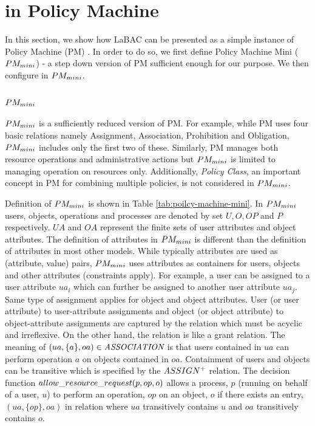 \section{\hlabac{} in Policy Machine}
\label{sec:pm}


In this section, we show how LaBAC can be presented as a simple instance of Policy Machine (PM) \cite{policy-machine}. In order to do so, we first define Policy Machine Mini ($PM_{mini}{}$) - a step down version of PM sufficient enough for our purpose. We then configure \hlabac{} in $PM_{mini}{}$.

\subsection{$PM_{mini}{}$}

$PM_{mini}{}$ is a sufficiently reduced version of PM.  For example, while PM uses four basic relations namely Assignment, Association, Prohibition and Obligation, $PM_{mini}$ includes only the first two of these. Similarly, PM manages both resource operations and administrative actions but $PM_{mini}$ is limited to managing operation on resources only.  Additionally, \textit{Policy Class}, an important concept in PM for combining multiple policies, is not considered in $PM_{mini}$. 




Definition of $PM_{mini}{}$ is shown in Table \ref{tab:poilcy-machine-mini}. In $PM_{mini}{}$ users, objects, operations and processes are denoted by set $U, O, OP$ and $P$ respectively. $UA$ and $OA$ represent the finite sets of user attributes and object attributes. The definition of attributes in $PM_{mini}$ is different than the definition of attributes in most other models. While typically attributes are used as (attribute, value) pairs, $PM_{mini}$ uses attributes  as containers for users, objects and other attributes (constraints apply). For example, a user can be assigned to a user attribute $ua_i$ which can further be assigned to another user attribute $ua_j$. Same type of assignment applies for object and object attributes. User (or user attribute) to user-attribute  assignments and object (or object attribute) to object-attribute assignments are captured by the \textit{\assignment}{} relation which must be acyclic and irreflexive. On the other hand, the \textit{\association}{} relation is like a grant relation. The meaning of $(ua,\{a\},oa) \in \textit{ASSOCIATION}$ is that users contained in $ua$ can perform operation $a$ on objects contained in $oa$. Containment of users and objects can be transitive which is specified by the $ASSIGN^+{}$ relation. The decision function  $allow\_resource\_request(p,op,o)$ allows a process, $p$ (running on behalf of a user, $u$) to perform an operation, $op$ on an object, $o$ if there exists an entry, $(ua,\{op\},oa)$ in \textit{\association}{} relation  where $ua$ transitively contains $u$ and $oa$ transitively contains $o$.

